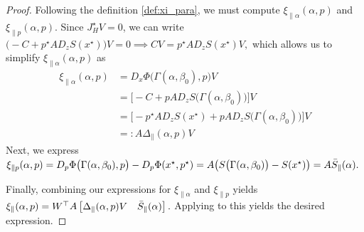 \documentclass[letterpaper, 10 pt, conference]{ieeeconf}
\begin{document}
\begin{proof}
    Following the definition \eqref{def:xi_para}, we must compute \(\xi_{\parallel\alpha}(\alpha,p)\) and \(\xi_{\parallel p}(\alpha,p)\).
    Since \(J^{\star}_H V = 0\), we can write \\
    \(
    \bigl(-C + p^{\star} A D_{z}S(x^{\star})\bigr) V = 0 \implies C V = p^{\star} A D_{z}S(x^{\star}) V,
    \)
    which allows us to simplify \(\xi_{\parallel\alpha}(\alpha,p)\) as
    \begin{align*}
        \xi_{\parallel\alpha}(\alpha,p) & = D_{x}\Phi\bigl(\Gamma(\alpha,\beta_0),p\bigr)V                                             \\
                                        & = \bigl[-C+p A D_{z}S\bigl(\Gamma(\alpha,\beta_0)\bigr)\bigr]V                               \\
                                        & = \bigl[-p^{\star} A D_{z}S(x^{\star}) + p A D_{z}S\bigl(\Gamma(\alpha,\beta_0)\bigr)\bigr]V \\
                                        & =: A \Delta_{\parallel}(\alpha,p) V
    \end{align*}
    Next, we express
    \(
    \xi_{\parallel p}(\alpha,p) = D_{p}\Phi\bigl(\Gamma(\alpha,\beta_0),p\bigr) - \\ D_{p}\Phi(x^{\star},p^{\star}) = A \bigl(S\bigl(\Gamma(\alpha,\beta_0)\bigr) - S(x^{\star})\bigr) = A \bar{S}_{\parallel}(\alpha).
    \)

    Finally, combining our expressions for \(\xi_{\parallel\alpha}\) and \(\xi_{\parallel p}\) yields
    \(
    \xi_{\parallel}(\alpha,p) = W^{\top} A \begin{bmatrix} \Delta_{\parallel}(\alpha,p) V & \bar{S}_{\parallel}(\alpha) \end{bmatrix}.
    \) Applying  to this yields the desired expression.
\end{proof}
\end{document}

